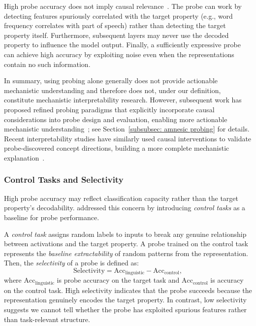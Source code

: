 \begin{warningbox}
High probe accuracy does not imply causal relevance~. The probe can work by detecting features spuriously correlated with the target property (e.g., word frequency correlates with part of speech) rather than detecting the target property itself. Furthermore, subsequent layers may never use the decoded property to influence the model output. Finally, a sufficiently expressive probe can achieve high accuracy by exploiting noise even when the representations contain no such information.
\end{warningbox}

In summary, using probing alone generally does not provide actionable mechanistic understanding and therefore does not, under our definition, constitute mechanistic interpretability research. However, subsequent work has proposed refined probing paradigms that explicitly incorporate causal considerations into probe design and evaluation, enabling more actionable mechanistic understanding~; see Section~\ref{subsubsec: amnesic probing} for details. Recent interpretability studies have similarly used causal interventions to validate probe-discovered concept directions, building a more complete mechanistic explanation~.

\subsubsection{Control Tasks and Selectivity}
High probe accuracy may reflect classification capacity rather than the target property's decodability.  addressed this concern by introducing \emph{control tasks} as a baseline for probe performance.

\begin{definitionbox}
A \emph{control task} assigns random labels to inputs to break any genuine relationship between activations and the target property. A probe trained on the control task represents the \emph{baseline extractability} of random patterns from the representation. Then, the \emph{selectivity} of a probe is defined as:
\[
\text{Selectivity} = \text{Acc}_{\text{linguistic}} - \text{Acc}_{\text{control}},
\]
where $\text{Acc}_{\text{linguistic}}$ is probe accuracy on the target task and $\text{Acc}_{\text{control}}$ is accuracy on the control task. High selectivity indicates that the probe succeeds because the representation genuinely encodes the target property. In contrast, low selectivity suggests we cannot tell whether the probe has exploited spurious features rather than task-relevant structure.
\end{definitionbox}


